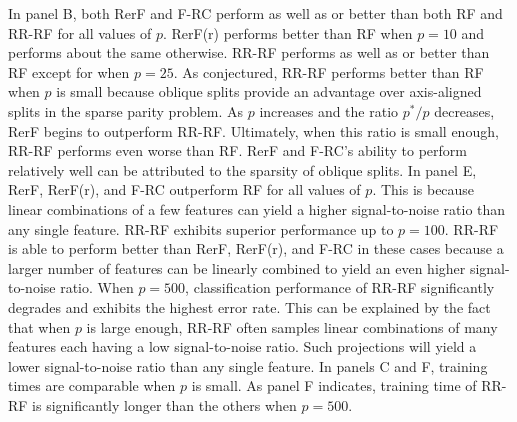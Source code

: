 \documentclass{article}
\begin{document}
In panel B, both RerF and F-RC perform as well as or better than both RF and RR-RF for all values of $p$. RerF(r) performs better than RF when $p = 10$ and performs about the same otherwise. RR-RF performs as well as or better than RF except for when $p = 25$. As conjectured, RR-RF performs better than RF when $p$ is small because oblique splits provide an advantage over axis-aligned splits in the sparse parity problem. As $p$ increases and the ratio $p^*/p$ decreases, RerF begins to outperform RR-RF. Ultimately, when this ratio is small enough, RR-RF performs even worse than RF. RerF and F-RC's ability to perform relatively well can be attributed to the sparsity of oblique splits. In panel E, RerF, RerF(r), and F-RC outperform RF for all values of $p$. This is because linear combinations of a few features can yield a higher signal-to-noise ratio than any single feature. RR-RF exhibits superior performance up to $p = 100$. RR-RF is able to perform better than RerF, RerF(r), and F-RC in these cases because a larger number of features can be linearly combined to yield an even higher signal-to-noise ratio. When $p = 500$, classification performance of RR-RF significantly degrades and exhibits the highest error rate. This can be explained by the fact that when $p$ is large enough, RR-RF often samples linear combinations of many features each having a low signal-to-noise ratio. Such projections will yield a lower signal-to-noise ratio than any single feature. In panels C and F, training times are comparable when $p$ is small. As panel F indicates, training time of RR-RF is significantly longer than the others when $p = 500$.
\end{document}
